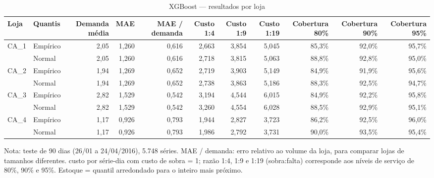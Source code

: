 \begin{table}[htbp]
\centering
\small
\caption{XGBoost — resultados por loja}
\label{tab:xgb_por_loja}
\begin{tabular}{llrrrrrrrrr}
\toprule
Loja & Quantis & Demanda média & MAE & MAE / demanda & Custo 1:4 & Custo 1:9 & Custo 1:19 & Cobertura 80\% & Cobertura 90\% & Cobertura 95\% \\
\midrule
CA\_1 & Empírico & 2,05 & 1,260 & 0,616 & 2,663 & 3,854 & 5,045 & 85,3\% & 92,0\% & 95,7\% \\
 & Normal & 2,05 & 1,260 & 0,616 & 2,718 & 3,815 & 5,063 & 88,8\% & 92,8\% & 95,0\% \\
\addlinespace
CA\_2 & Empírico & 1,94 & 1,269 & 0,652 & 2,719 & 3,903 & 5,149 & 84,9\% & 91,9\% & 95,6\% \\
 & Normal & 1,94 & 1,269 & 0,652 & 2,738 & 3,863 & 5,186 & 88,3\% & 92,5\% & 94,7\% \\
\addlinespace
CA\_3 & Empírico & 2,82 & 1,529 & 0,542 & 3,194 & 4,544 & 6,015 & 84,9\% & 92,2\% & 95,8\% \\
 & Normal & 2,82 & 1,529 & 0,542 & 3,260 & 4,554 & 6,028 & 88,5\% & 92,9\% & 95,1\% \\
\addlinespace
CA\_4 & Empírico & 1,17 & 0,926 & 0,793 & 1,944 & 2,827 & 3,723 & 86,2\% & 92,5\% & 96,0\% \\
 & Normal & 1,17 & 0,926 & 0,793 & 1,986 & 2,792 & 3,731 & 90,0\% & 93,5\% & 95,4\% \\
\bottomrule
\end{tabular}
\par\smallskip
{\footnotesize Nota: teste de 90 dias (26/01 a 24/04/2016), 5.748 séries. MAE / demanda: erro relativo ao volume da loja, para comparar lojas de tamanhos diferentes. custo por série-dia com custo de sobra = 1; razão 1:4, 1:9 e 1:19 (sobra:falta) corresponde aos níveis de serviço de 80\%, 90\% e 95\%. Estoque = quantil arredondado para o inteiro mais próximo.}
\end{table}
